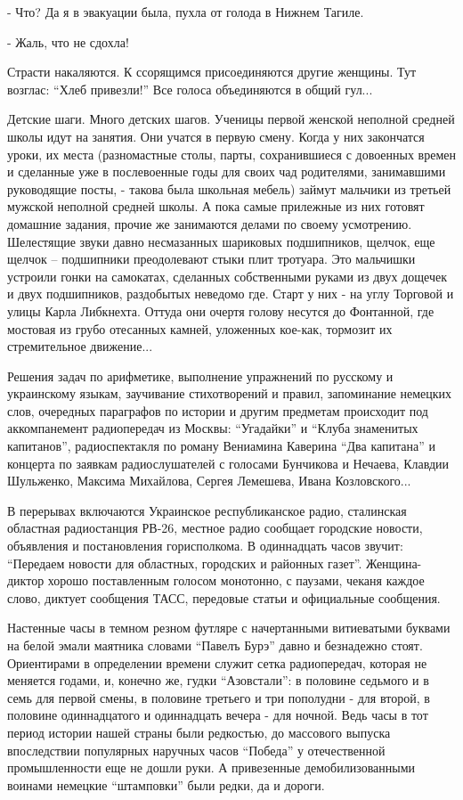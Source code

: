 - Что? Да я в эвакуации была, пухла от голода в Нижнем Тагиле.

- Жаль, что не сдохла! 

Страсти накаляются. К ссорящимся присоединяются другие женщины. Тут возглас:
\enquote{Хлеб привезли!} Все голоса объединяются в общий гул...

Детские шаги. Много детских шагов. Ученицы первой женской неполной средней
школы идут на занятия. Они учатся в первую смену. Когда у них закончатся уроки,
их места (разномастные столы, парты, сохранившиеся с довоенных времен и
сделанные уже в послевоенные годы для своих чад родителями, занимавшими
руководящие посты, - такова была школьная мебель) займут мальчики из третьей
мужской неполной средней школы. А пока самые прилежные из них готовят домашние
задания, прочие же занимаются делами по своему усмотрению. Шелестящие звуки
давно несмазанных шариковых подшипников, щелчок, еще щелчок – подшипники
преодолевают стыки плит тротуара. Это мальчишки устроили гонки на самокатах,
сделанных собственными руками из двух дощечек и двух подшипников, раздобытых
неведомо где. Старт у них  - на углу Торговой и улицы Карла Либкнехта. Оттуда
они очертя голову несутся до Фонтанной, где мостовая из грубо отесанных камней,
уложенных кое-как, тормозит их стремительное движение...

Решения задач по арифметике, выполнение упражнений по русскому и украинскому
языкам, заучивание стихотворений и правил, запоминание немецких слов, очередных
параграфов по истории и другим предметам происходит под аккомпанемент
радиопередач из Москвы: \enquote{Угадайки} и  \enquote{Клуба знаменитых капитанов},
радиоспектакля по роману Вениамина Каверина \enquote{Два капитана} и концерта по
заявкам  радиослушателей с голосами Бунчикова и Нечаева, Клавдии Шульженко,
Максима Михайлова, Сергея Лемешева, Ивана Козловского...

В перерывах включаются Украинское республиканское радио, сталинская областная
радиостанция РВ-26, местное радио сообщает городские новости, объявления и
постановления горисполкома. В одиннадцать часов звучит: \enquote{Передаем
новости для областных, городских и районных газет}. Женщина-диктор хорошо
поставленным голосом монотонно, с паузами, чеканя каждое слово, диктует
сообщения ТАСС, передовые статьи и официальные сообщения.

Настенные часы в темном резном футляре с начертанными витиеватыми буквами на
белой эмали маятника словами \enquote{Павелъ Бурэ} давно и безнадежно стоят.
Ориентирами в определении времени служит сетка радиопередач, которая не
меняется годами, и, конечно же, гудки \enquote{Азовстали}:  в половине седьмого
и в семь для первой смены, в половине третьего и три пополудни - для второй, в
половине одиннадцатого и одиннадцать вечера - для ночной. Ведь часы в тот
период истории нашей страны были редкостью, до массового выпуска впоследствии
популярных наручных часов \enquote{Победа} у отечественной промышленности еще
не дошли руки. А привезенные демобилизованными воинами немецкие
\enquote{штамповки} были редки, да и дороги.

